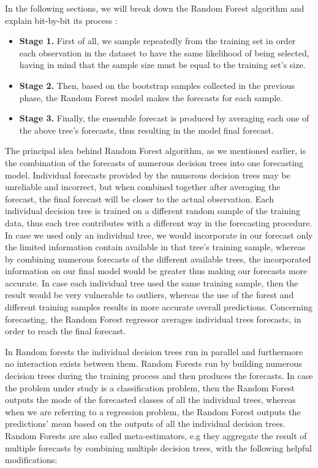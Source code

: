 In the following sections, we will break down the Random Forest algorithm and explain bit-by-bit its process \cite{built}:
\begin{itemize}
    \item \textbf{Stage 1.} First of all, we sample repeatedly from the training set in order each observation in the dataset to have the same likelihood of being selected, having in mind that the sample size must be equal to the training set's size.
    \item \textbf{Stage 2.}  Then, based on the bootstrap samples collected in the previous phase, the Random Forest model makes the forecasts for each sample.
    \item \textbf{Stage 3.} Finally, the ensemble forecast is produced by averaging each one of the above tree's forecasts, thus resulting in the model final forecast.
\end{itemize}
\par The principal idea behind Random Forest algorithm, as we mentioned earlier, is the combination of the forecasts of numerous decision trees into one forecasting model. 
Individual forecasts provided by the numerous decision trees may be unreliable and incorrect, but when combined together after averaging the forecast, the final forecast will be closer to the actual observation. Each individual decision tree is trained on a different random sample of the training data, thus each tree contributes with a different way in the forecasting procedure. In case we used only an individual tree, we would incorporate in our forecast only the limited information contain available in that tree's training sample, whereas by combining numerous forecasts of the different available trees, the incorporated information on our final model would be greater thus making our forecasts more accurate. In case each individual tree used the same training sample, then the result would be very vulnerable to outliers, whereas the use of the forest and  different training samples results in more accurate overall predictions. Concerning forecasting, the Random Forest regressor averages individual trees forecasts, in order to reach the final forecast.
\par   In Random forests the individual decision trees run in parallel and furthermore no interaction exists between them. Random Forests run by building numerous decision trees during the training process and then produces the forecasts. In case the problem under study is a classification problem, then the Random Forest outputs the mode of the forecasted classes of all the individual trees, whereas when we are referring to a regression problem, the Random Forest outputs the predictions' mean based on the outputs of all the individual decision trees. Random Forests are also called meta-estimators, e.g they aggregate the result of multiple forecasts by combining multiple decision trees, with the following helpful modifications: \cite{srivastava2015tuning}
